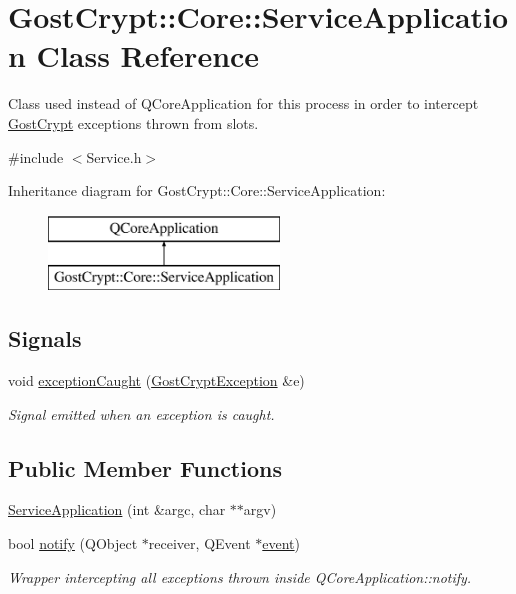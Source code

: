 \hypertarget{class_gost_crypt_1_1_core_1_1_service_application}{}\section{Gost\+Crypt\+:\+:Core\+:\+:Service\+Application Class Reference}
\label{class_gost_crypt_1_1_core_1_1_service_application}


Class used instead of Q\+Core\+Application for this process in order to intercept \hyperlink{namespace_gost_crypt}{Gost\+Crypt} exceptions thrown from slots.  




{\ttfamily \#include $<$Service.\+h$>$}

Inheritance diagram for Gost\+Crypt\+:\+:Core\+:\+:Service\+Application\+:\begin{figure}[H]
\begin{center}
\leavevmode
\includegraphics[height=2.000000cm]{class_gost_crypt_1_1_core_1_1_service_application}
\end{center}
\end{figure}
\subsection*{Signals}
\begin{DoxyCompactItemize}
\item 
void \hyperlink{class_gost_crypt_1_1_core_1_1_service_application_a4d7ebe6b5b5e79b1474d963ed566350f}{exception\+Caught} (\hyperlink{class_gost_crypt_1_1_gost_crypt_exception}{Gost\+Crypt\+Exception} \&e)
\begin{DoxyCompactList}\small\item\em Signal emitted when an exception is caught. \end{DoxyCompactList}\end{DoxyCompactItemize}
\subsection*{Public Member Functions}
\begin{DoxyCompactItemize}
\item 
\hyperlink{class_gost_crypt_1_1_core_1_1_service_application_a35376a0f34ccc7629aff5dd896ff47f2}{Service\+Application} (int \&argc, char $\ast$$\ast$argv)
\item 
bool \hyperlink{class_gost_crypt_1_1_core_1_1_service_application_ae660ed5233e5f75dd85ced4f59a89359}{notify} (Q\+Object $\ast$receiver, Q\+Event $\ast$\hyperlink{pkcs11t_8h_afaa077e4b9760c92cbaf0d838e743d8c}{event})
\begin{DoxyCompactList}\small\item\em Wrapper intercepting all exceptions thrown inside Q\+Core\+Application\+::notify. \end{DoxyCompactList}\end{DoxyCompactItemize}


